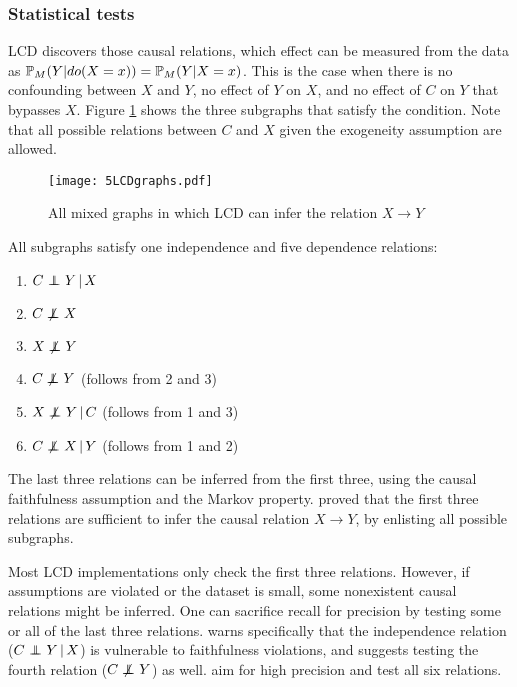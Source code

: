 \subsubsection{Statistical tests}

LCD discovers those causal relations, which effect can be measured from the data as $\mathbb{P} _M(Y|do(X=x)) = \mathbb{P} _M(Y|X=x)$. This is the case when there is no confounding between $X$ and $Y$, no effect of $Y$ on $X$, and no effect of $C$ on $Y$ that bypasses $X$. Figure \ref{fig:5:lcdgraphs} shows the three subgraphs that satisfy the condition. Note that all possible relations between $C$ and $X$ given the exogeneity assumption are allowed.

\begin{figure}[h]
    \centering
    \texttt{[image: 5LCDgraphs.pdf]}
    \caption{All mixed graphs in which LCD can infer the relation $X\to Y$}
    \label{fig:5:lcdgraphs}
\end{figure}

All subgraphs satisfy one independence and five dependence relations:

\begin{enumerate}[noitemsep]
    \item $C \operatorname*{{\,\perp\mkern-12mu\perp\,}} Y \,|\, X $
    \item $C \operatorname*{{\,\not\mkern-1mu\perp\mkern-12mu\perp\,}} X$
    \item $X \operatorname*{{\,\not\mkern-1mu\perp\mkern-12mu\perp\,}} Y$
    \item $C \operatorname*{{\,\not\mkern-1mu\perp\mkern-12mu\perp\,}} Y$ (follows from 2 and 3)
    \item $X \operatorname*{{\,\not\mkern-1mu\perp\mkern-12mu\perp\,}} Y \,|\, C$ (follows from 1 and 3)
    \item $C \operatorname*{{\,\not\mkern-1mu\perp\mkern-12mu\perp\,}} X \,|\, Y$ (follows from 1 and 2)
\end{enumerate}

The last three relations can be inferred from the first three, using the causal faithfulness assumption and the Markov property. \citet{cooper1997simple} proved that the first three relations are sufficient to infer the causal relation $X\to Y$, by enlisting all possible subgraphs. 

Most LCD implementations only check the first three relations. However, if assumptions are violated or the dataset is small, some nonexistent causal relations might be inferred. One can sacrifice recall for precision by testing some or all of the last three relations. \citet{cooper1997simple} warns specifically that the independence relation ($C \operatorname*{{\,\perp\mkern-12mu\perp\,}} Y \,|\, X$) is vulnerable to faithfulness violations, and suggests testing the fourth relation ($C \operatorname*{{\,\not\mkern-1mu\perp\mkern-12mu\perp\,}} Y$) as well. \citet{triantafillou2017predicting} aim for high precision and test all six relations.

